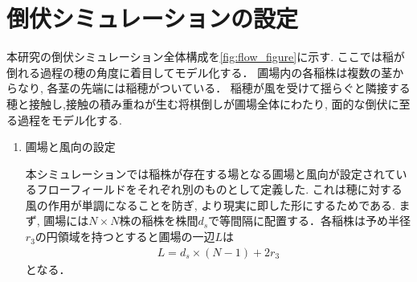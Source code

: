 \documentclass[twocolumn]{jarticle}
\begin{document}
\section{倒伏シミュレーションの設定}
本研究の倒伏シミュレーション全体構成を\ref{fig:flow_figure}に示す.
ここでは稲が倒れる過程の穂の角度に着目してモデル化する．
圃場内の各稲株は複数の茎からなり, 各茎の先端には稲穂がついている．
稲穂が風を受けて揺らぐと隣接する穂と接触し,接触の積み重ねが生む将棋倒しが圃場全体にわたり, 面的な倒伏に至る過程をモデル化する.

    \begin{enumerate}
    \item \label{item:setting} 圃場と風向の設定
    
    本シミュレーションでは稲株が存在する場となる圃場と風向が設定されているフローフィールドをそれぞれ別のものとして定義した.
    これは穂に対する風の作用が単調になることを防ぎ, より現実に即した形にするためである.
    まず, 圃場には$N \times N$株の稲株を株間$d_{s}$で等間隔に配置する．各稲株は予め半径$r_{3}$の円領域を持つとすると圃場の一辺$L$は
    \begin{eqnarray}
        L = d_{s} \times (N-1) + 2r_{3}\nonumber
    \end{eqnarray}
    となる．


\end{enumerate}
\end{document}
